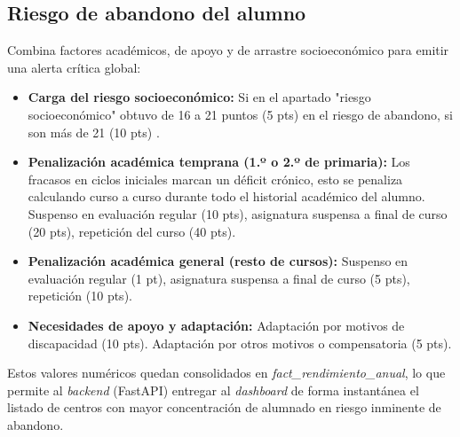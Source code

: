 \subsection{Riesgo de abandono del alumno}
Combina factores académicos, de apoyo y de arrastre socioeconómico para emitir una alerta crítica global:

\begin{itemize}
    \item \textbf{Carga del riesgo socioeconómico:} Si en el apartado "riesgo socioeconómico" obtuvo de 16 a 21 puntos (5 pts) en el riesgo de abandono, si son más de 21 (10 pts) .
    \item \textbf{Penalización académica temprana (1.º o 2.º de primaria):} Los fracasos en ciclos iniciales marcan un déficit crónico, esto se penaliza calculando curso a curso durante todo el historial académico del alumno. Suspenso en evaluación regular (10 pts), asignatura suspensa a final de curso (20 pts), repetición del curso (40 pts).
    \item \textbf{Penalización académica general (resto de cursos):} Suspenso en evaluación regular (1 pt), asignatura suspensa a final de curso (5 pts), repetición (10 pts).
    \item \textbf{Necesidades de apoyo y adaptación:} Adaptación por motivos de discapacidad (10 pts). Adaptación por otros motivos o compensatoria (5 pts).
\end{itemize}

Estos valores numéricos quedan consolidados en \textit{fact\_rendimiento\_anual}, lo que permite al \textit{backend} (FastAPI) entregar al \textit{dashboard} de forma instantánea el listado de centros con mayor concentración de alumnado en riesgo inminente de abandono.
